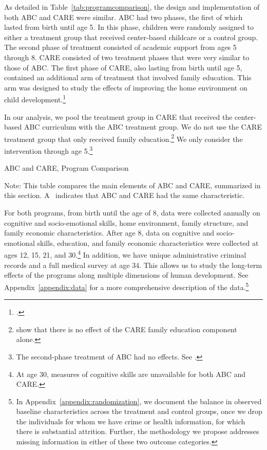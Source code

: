 As detailed in Table~\ref{tab:programcomparison}, the design and implementation of both ABC and CARE were similar. ABC had two phases, the first of which lasted from birth until age 5. In this phase, children were randomly assigned to either a treatment group that received center-based childcare or a control group. The second phase of treatment consisted of academic support from ages 5 through 8. CARE consisted of two treatment phases that were very similar to those of ABC. The first phase of CARE, also lasting from birth until age 5, contained an additional arm of treatment that involved family education. This arm was designed to study the effects of improving the home environment on child development.\footnote{\citet{Wasik_Ramey_etal_1990_CD}.}

In our analysis, we pool the treatment group in CARE that received the center-based ABC curriculum with the ABC treatment group. We do not use the CARE treatment group that only received family education.\footnote{\citet{ABCCARE_Dataset} show that there is no effect of the CARE family education component alone.} We only consider the intervention through age 5.\footnote{The second-phase treatment of ABC had no effects. See \citealp{Campbell_Conti_etal_2014_EarlyChildhoodInvestments}.}

\begin{table}[htbp]
\centering
\caption{ABC and CARE, Program Comparison} \label{tab:programcomparison}
\begin{adjustbox}{max width=\textwidth}
\begin{threeparttable}
	
\begin{tablenotes}
\footnotesize
\item Note: This table compares the main elements of ABC and CARE, summarized in this section. A \checkmark\ indicates that ABC and CARE had the same characteristic.
\end{tablenotes}
\end{threeparttable}
\end{adjustbox}
\end{table}


For both programs, from birth until the age of 8, data were collected annually on cognitive and socio-emotional skills, home environment, family structure, and family economic characteristics. After age 8, data on cognitive and socio-emotional skills, education, and family economic characteristics were collected at ages 12, 15, 21, and 30.\footnote{At age 30, measures of cognitive skills are unavailable for both ABC and CARE.} In addition, we have unique administrative criminal records and a full medical survey at age 34. This allows us to study the long-term effects of the programs along multiple dimensions of human development. See Appendix~\ref{appendix:data} for a more comprehensive description of the data.\footnote{In Appendix~\ref{appendix:randomization}, we document the balance in observed baseline characteristics across the treatment and control groups, once we drop the individuals for whom we have crime or health information, for which there is substantial attrition. Further, the methodology we propose addresses missing information in either of these two outcome categories.}

